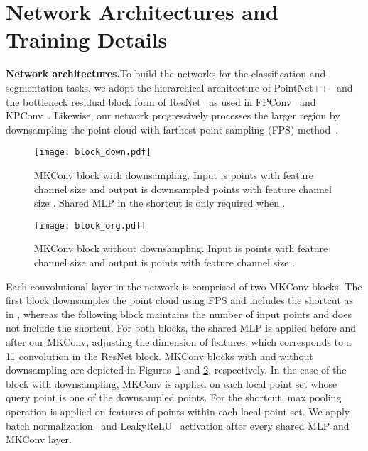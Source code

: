\documentclass[preprint,12pt]{elsarticle}
\begin{document}
\section{Network Architectures and Training Details}
\label{sec:net}
\noindent\textbf{Network architectures.}\hspace{0.3cm}To build the networks for the classification and segmentation tasks, we adopt the hierarchical architecture of PointNet++~\citep{qi2017pointnet++} and the bottleneck residual block form of ResNet~\citep{he2016deep} as used in FPConv~\citep{lin2020fpconv} and KPConv~\citep{thomas2019kpconv}. Likewise, our network progressively processes the larger region by downsampling the point cloud with farthest point sampling (FPS) method~\citep{qi2017pointnet++}. \begin{figure}[t]
\centering
\texttt{[image: block\_down.pdf]}
\vspace{-0.5cm}
\caption{MKConv block with downsampling. Input is  points with feature channel size  and output is  downsampled points with feature channel size . Shared MLP in the shortcut is only required when .}
\label{fig:block_down}
\end{figure}
\begin{figure}[t]
\centering
\texttt{[image: block\_org.pdf]}
\vspace{-0.5cm}
\caption{MKConv block without downsampling. Input is  points with feature channel size  and output is  points with feature channel size .}
\label{fig:block_org}
\end{figure}Each convolutional layer in the network is comprised of two MKConv blocks. The first block downsamples the point cloud using FPS and includes the shortcut as in \cite{he2016deep}, whereas the following block maintains the number of input points and does not include the shortcut. For both blocks, the shared MLP is applied before and after our MKConv, adjusting the dimension of features, which corresponds to a 11 convolution in the ResNet block. MKConv blocks with and without downsampling are depicted in Figures~\ref{fig:block_down} and \ref{fig:block_org}, respectively. In the case of the block with downsampling, MKConv is applied on each local point set whose query point is one of the  downsampled points. For the shortcut, max pooling operation is applied on features of points within each local point set. We apply batch normalization~\citep{ioffe2015batch} and LeakyReLU~\citep{maas2013rectifier} activation after every shared MLP and MKConv layer. 
\end{document}

